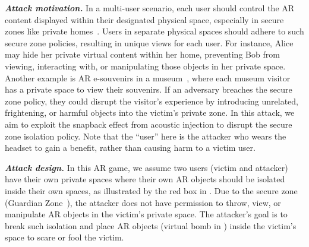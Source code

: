 \noindent \emph{\textbf{Attack motivation.}} 
In a multi-user scenario, each user should control the AR content displayed within their designated physical space, especially in secure zones like private homes~\cite{ruth2019secure}. Users in separate physical spaces should adhere to such secure zone policies, resulting in unique views for each user. For instance, Alice may hide her private virtual content within her home, preventing Bob from viewing, interacting with, or manipulating those objects in her private space. Another example is AR e-souvenirs in a museum~\cite{kang2022tie}, 
where each museum visitor has a private space to view their souvenirs. If an adversary breaches the secure zone policy, they could disrupt the visitor's experience by introducing unrelated, frightening, or harmful objects into the victim’s private zone. 
In this attack, we aim to exploit the snapback effect from acoustic injection to disrupt the secure zone isolation policy. 
Note that the ``user'' here is the attacker who wears the headset to gain a benefit, rather than causing harm to a victim user.

\noindent \emph{\textbf{Attack design.}} In this AR game, we assume two users (victim and attacker) have their own private spaces where their own AR objects should be isolated inside their own spaces, as illustrated by the red box in .
Due to the secure zone (\eg Guardian Zone~\cite{guardian_zone_vr}), the attacker does not have permission to throw, view, or manipulate AR objects in the victim's private space. The attacker's goal is to break such isolation and place AR objects (\eg virtual bomb in ) inside the victim's space to scare or fool the victim. 

